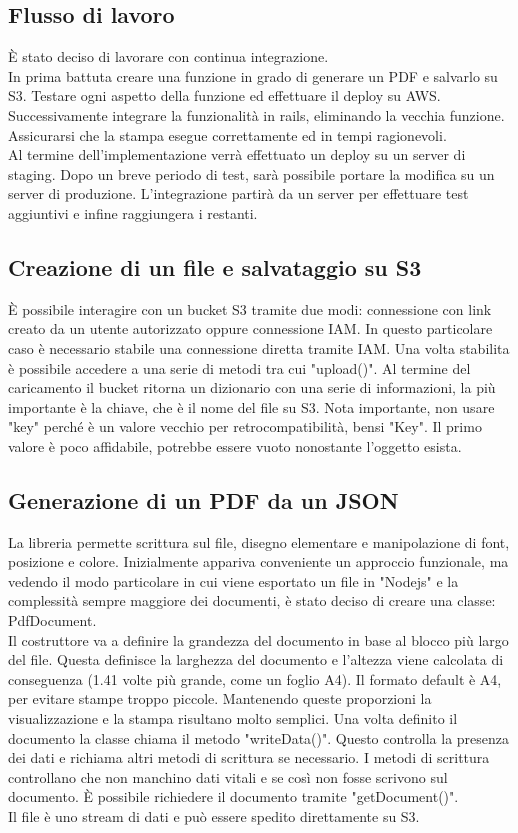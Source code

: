 \documentclass[12pt]{article}
\begin{document}
\subsection{Flusso di lavoro}
È stato deciso di lavorare con continua integrazione. 
\\ In prima battuta creare una funzione in grado di generare un PDF e salvarlo 
su S3. Testare ogni aspetto della funzione ed effettuare il deploy su AWS. 
\\ Successivamente integrare la funzionalità in rails, eliminando la vecchia 
funzione. Assicurarsi che la stampa esegue correttamente ed in tempi ragionevoli.
\\ Al termine dell'implementazione verrà effettuato un deploy su un server 
di staging. Dopo un breve periodo di test, sarà possibile portare la modifica 
su un server di produzione. L'integrazione partirà da un server per effettuare 
test aggiuntivi e infine raggiungera i restanti.


\subsection{Creazione di un file e salvataggio su S3}
È possibile interagire con un bucket S3 tramite due modi: connessione con link 
creato da un utente autorizzato oppure connessione IAM. In questo particolare 
caso è necessario stabile una connessione diretta tramite IAM. Una volta stabilita 
è possibile accedere a una serie di metodi tra cui "upload()". Al termine del 
caricamento il bucket ritorna un dizionario con una serie di informazioni, la 
più importante è la chiave, che è il nome del file su S3. Nota importante, 
non usare "key" perché è un valore vecchio per retrocompatibilità, bensi "Key". 
Il primo valore è poco affidabile, potrebbe essere vuoto nonostante l'oggetto 
esista.

\subsection{Generazione di un PDF da un JSON}
La libreria permette scrittura sul file, disegno elementare e manipolazione di 
font, posizione e colore.
Inizialmente appariva conveniente un approccio funzionale, ma vedendo il modo 
particolare in cui viene esportato un file in "Nodejs" e la complessità sempre 
maggiore dei documenti, è stato deciso di creare una classe: PdfDocument. 
\\
Il costruttore va a definire la grandezza del documento in base al blocco più 
largo del file.
Questa definisce la larghezza del documento e l'altezza viene calcolata di
conseguenza (1.41 volte più grande, come un foglio A4).
Il formato default è A4, per evitare stampe troppo piccole.
Mantenendo queste proporzioni la visualizzazione e la stampa risultano molto 
semplici.
Una volta definito il documento la classe chiama il metodo "writeData()".
Questo controlla la presenza dei dati e richiama altri metodi di scrittura 
se necessario.
I metodi di scrittura controllano che non manchino dati vitali e se così non fosse 
scrivono sul documento. 
È possibile richiedere il documento tramite "getDocument()". 
\\ Il file è uno stream di dati e può essere spedito direttamente su S3. 
\end{document}
